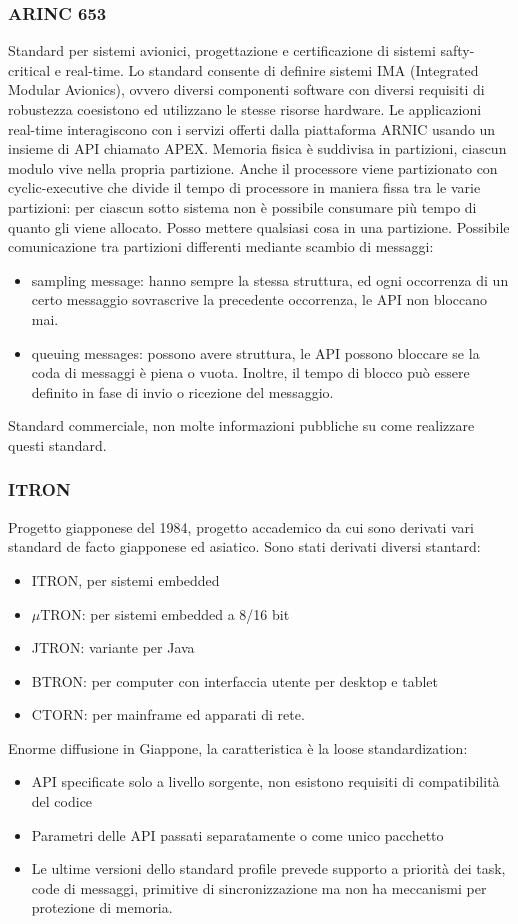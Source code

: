 \documentclass[12pt, oneside]{extbook}
\begin{document}
\subsubsection{ARINC 653}
Standard per sistemi avionici, progettazione e certificazione di sistemi safty-critical e real-time. Lo standard consente di definire sistemi IMA (Integrated Modular Avionics), ovvero diversi componenti software con diversi requisiti di robustezza coesistono ed utilizzano le stesse risorse hardware. Le applicazioni real-time interagiscono con i servizi offerti dalla piattaforma ARNIC usando un insieme di API chiamato APEX. Memoria fisica è suddivisa in partizioni, ciascun modulo vive nella propria partizione. Anche il processore viene partizionato con cyclic-executive che divide il tempo di processore in maniera fissa tra le varie partizioni:
per ciascun sotto sistema non è possibile consumare più tempo di quanto gli viene allocato. Posso mettere qualsiasi cosa in una partizione. Possibile comunicazione tra partizioni differenti mediante scambio di messaggi:
\begin{itemize}
\item sampling message: hanno sempre la stessa struttura, ed ogni occorrenza di un certo messaggio sovrascrive la precedente occorrenza, le API non bloccano mai.
\item queuing messages: possono avere struttura, le API possono bloccare se la coda di messaggi è piena o vuota. Inoltre, il tempo di blocco può essere definito in fase di invio o ricezione del messaggio.
\end{itemize}
Standard commerciale, non molte informazioni pubbliche su come realizzare questi standard.
\subsubsection{ITRON}
Progetto giapponese del 1984, progetto accademico da cui sono derivati vari standard de facto giapponese ed asiatico. Sono stati derivati diversi stantard:
\begin{itemize}
\item ITRON, per sistemi embedded
\item $\mu$TRON: per sistemi embedded a 8/16 bit
\item JTRON: variante per Java
\item BTRON: per computer con interfaccia utente per desktop e tablet
\item CTORN: per mainframe ed apparati di rete.
\end{itemize}
Enorme diffusione in Giappone, la caratteristica è la loose standardization:
\begin{itemize}
\item API specificate solo a livello sorgente, non esistono requisiti di compatibilità del codice
\item Parametri delle API passati separatamente o come unico pacchetto
\item Le ultime versioni dello standard profile prevede supporto a priorità dei task, code di messaggi, primitive di sincronizzazione ma non ha meccanismi per protezione di memoria.
\end{itemize}
\end{document}
